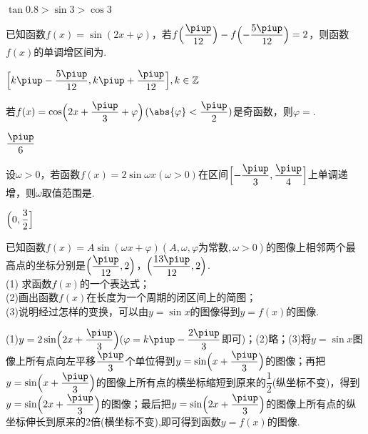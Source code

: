 \begin{exercise}
      \begin{answer}
        $\tan 0.8>\sin 3>\cos 3$
      \end{answer}
    \item%
      已知函数$f(x)=\sin (2x+\varphi)$，若$    f\Bigl(\dfrac{\piup}{12}\Bigr)-f\Bigl(-\dfrac{5\piup}{12}\Bigr)=2 $，则函数$f(x)$的单调增区间为\tk.
      \begin{answer}
        $\Bigl[k\piup-\dfrac{5\piup}{12},k\piup+\dfrac{\piup}{12}\Bigr],k\in\mathbb{Z}$
      \end{answer}
    \item%
      若$f(x)=\cos\Bigl(2x+\dfrac{\piup}3+\varphi\Bigr)$$(\abs{\varphi}<\dfrac{\piup}2)$是奇函数，则$\varphi=$\tk.
      \begin{answer}
        $\dfrac{\piup}6$
      \end{answer}
    \item%
      设$\omega>0$，若函数$f(x)=2\sin \omega x(\omega>0)$在区间$\Bigl[-\dfrac{\piup}3,\dfrac{\piup}4 \Bigr]$上单调递增，则$\omega$取值范围是\tk.
      \begin{answer}
        $\Bigl(0,\dfrac32\Bigr]$
      \end{answer}
    \item%
      已知函数$f(x)=A\sin(\omega x+\varphi)(A,\omega,\varphi\text{为常数},\omega>0)$的图像上相邻两个最高点的坐标分别是$\Bigl(\dfrac{\piup}{12},2\Bigr)$，$\Bigl(\dfrac{13\piup}{12},2\Bigr)$.\\
      (1) 求函数$f(x)$的一个表达式；\\
      (2)画出函数$f(x)$在长度为一个周期的闭区间上的简图；\\
      (3)说明经过怎样的变换，可以由$y=\sin x$的图像得到$y=f(x)$的图像.
      \begin{answer}
        (1)$y=2\sin\Bigl(2x+\dfrac{\piup}3\Bigr)(\varphi=k\piup-\dfrac{2\piup}3$即可)；(2)略；(3)将$y=\sin x$图像上所有点向左平移$\dfrac{\piup}3$个单位得到$y=\sin \Bigl(x+\dfrac{\piup}3\Bigr)$的图像；再把$y=\sin \Bigl(x+\dfrac{\piup}3\Bigr)$的图像上所有点的横坐标缩短到原来的$\dfrac12$(纵坐标不变)，得到$y=\sin \Bigl(2x+\dfrac{\piup}3\Bigr)$的图像；最后把$y=\sin \Bigl(2x+\dfrac{\piup}3\Bigr)$的图像上所有点的纵坐标伸长到原来的2倍(横坐标不变),即可得到函数$y=f(x)$的图像.
      \end{answer}
    \vspace{6cm}
    \item%
$$
\end{exercise}
